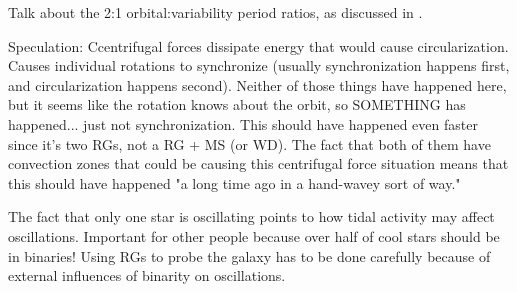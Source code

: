 Talk about the 2:1 orbital:variability period ratios, as discussed in \citet{gau14}.

Speculation:
Ccentrifugal forces dissipate energy that would cause circularization. Causes individual rotations to synchronize (usually synchronization happens first, and circularization happens second). Neither of those things have happened here, but it seems like the rotation knows about the orbit, so SOMETHING has happened... just not synchronization. This should have happened even faster since it's two RGs, not a RG + MS (or WD). The fact that both of them have convection zones that could be causing this centrifugal force situation means that this should have happened "a long time ago in a hand-wavey sort of way."

The fact that only one star is oscillating points to how tidal activity may affect oscillations.
Important for other people because over half of cool stars should be in binaries! Using RGs to probe the galaxy has to be done carefully because of external influences of binarity on oscillations.

    
    